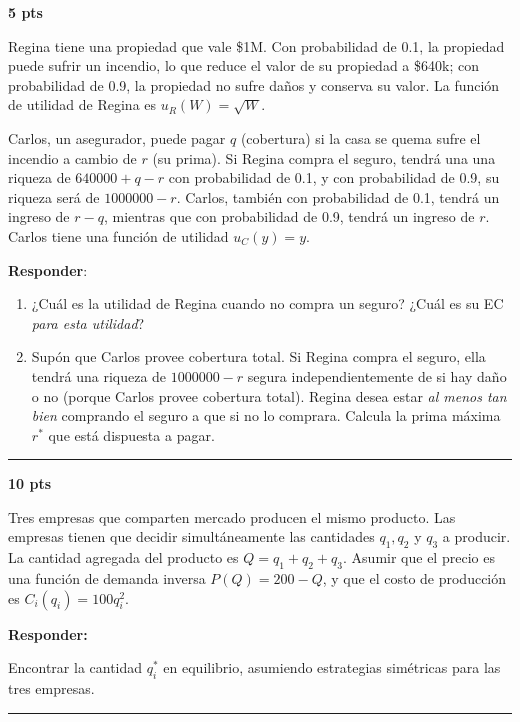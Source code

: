 \documentclass[12pt]{scrartcl}
\begin{document}
\begin{Exercise}[name={Problema}]

    \textbf{5 pts}

    Regina tiene una propiedad que vale \$1M. Con probabilidad de 0.1, la propiedad puede sufrir un incendio, lo que reduce el valor de su propiedad a \$640k; con probabilidad de 0.9, la propiedad no sufre daños y conserva su valor. La función de utilidad de Regina es $u_{R}(W) = \sqrt{W}$.

    Carlos, un asegurador, puede pagar $q$ (cobertura) si la casa se quema sufre el incendio a cambio de $r$ (su prima). Si Regina compra el seguro, tendrá una una riqueza de $640000 + q -r$ con probabilidad de 0.1, y con probabilidad de 0.9, su riqueza será de $1 000 000 - r$. Carlos, también con probabilidad de 0.1, tendrá un ingreso de $r-q$, mientras que con probabilidad de 0.9, tendrá un ingreso de $r$. Carlos tiene una función de utilidad $u_{C}(y)=y$.

    \textbf{Responder}:

    \begin{enumerate}
        \setlength{\itemsep}{0pt}
        \setlength{\parskip}{0pt}
        \setlength{\parsep}{0pt}
        \item ¿Cuál es la utilidad de Regina cuando no compra un seguro? ¿Cuál es su EC \textit{para esta utilidad}?\\
        \item Supón que Carlos provee cobertura total. Si Regina compra el seguro, ella tendrá una riqueza de $1 000 000 - r$ segura independientemente de si hay daño o no (porque Carlos provee cobertura total). Regina desea estar \textit{al menos tan bien} comprando el seguro a que si no lo comprara. Calcula la prima máxima $r^*$ que está dispuesta a pagar.
    \end{enumerate}

\end{Exercise}

\rule{5cm}{1pt}

\begin{Exercise}[name={Problema}]

    \textbf{10 pts}

    Tres empresas que comparten mercado producen el mismo producto. Las empresas tienen que decidir simultáneamente las cantidades $q_1, q_2$ y $q_3$ a producir. La cantidad agregada del producto es $Q=q_1+q_2+q_3$. Asumir que el precio es una función de demanda inversa $P(Q)=200-Q$, y que el costo de producción es $C_i(q_i)=100q_i^2$.

    \textbf{Responder:}

    Encontrar la cantidad $q_i^*$  en equilibrio, asumiendo estrategias simétricas para las tres empresas.

\end{Exercise}
\rule{5cm}{1pt}
\end{document}
